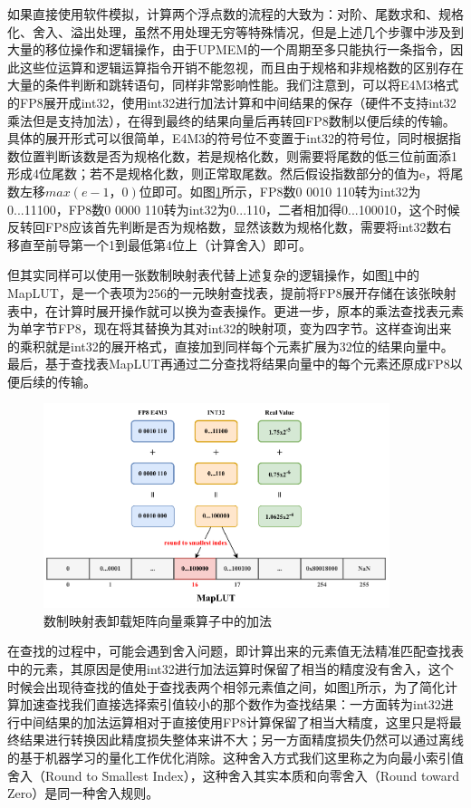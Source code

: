 如果直接使用软件模拟，计算两个浮点数的流程的大致为：对阶、尾数求和、规格化、舍入、溢出处理，虽然不用处理无穷等特殊情况，但是上述几个步骤中涉及到大量的移位操作和逻辑操作，由于UPMEM的一个周期至多只能执行一条指令\cite{UPMEMHotChips}，因此这些位运算和逻辑运算指令开销不能忽视，而且由于规格和非规格数的区别存在大量的条件判断和跳转语句，同样非常影响性能。我们注意到，可以将E4M3格式的FP8展开成int32，使用int32进行加法计算和中间结果的保存（硬件不支持int32乘法但是支持加法），在得到最终的结果向量后再转回FP8数制以便后续的传输。具体的展开形式可以很简单，E4M3的符号位不变置于int32的符号位，同时根据指数位置判断该数是否为规格化数，若是规格化数，则需要将尾数的低三位前面添1形成4位尾数；若不是规格化数，则正常取尾数。然后假设指数部分的值为e，将尾数左移$max(e-1，0)$位即可。如图\ref{LUTBS}所示，FP8数0 0010 110转为int32为0...11100，FP8数0 0000 110转为int32为0...110，二者相加得0...100010，这个时候反转回FP8应该首先判断是否为规格数，显然该数为规格化数，需要将int32数右移直至前导第一个1到最低第4位上（计算舍入）即可。

但其实同样可以使用一张数制映射表代替上述复杂的逻辑操作，如图\ref{LUTBS}中的MapLUT，是一个表项为256的一元映射查找表，提前将FP8展开存储在该张映射表中，在计算时展开操作就可以换为查表操作。更进一步，原本的乘法查找表元素为单字节FP8，现在将其替换为其对int32的映射项，变为四字节。这样查询出来的乘积就是int32的展开格式，直接加到同样每个元素扩展为32位的结果向量中。最后，基于查找表MapLUT再通过二分查找将结果向量中的每个元素还原成FP8以便后续的传输。

\begin{figure}[!htbp]
	\centering
    \includegraphics[width=0.9\textwidth]{figures/BinarySearch.pdf}
	\caption{数制映射表卸载矩阵向量乘算子中的加法}
    \label{LUTBS}
\end{figure}

在查找的过程中，可能会遇到舍入问题，即计算出来的元素值无法精准匹配查找表中的元素，其原因是使用int32进行加法运算时保留了相当的精度没有舍入，这个时候会出现待查找的值处于查找表两个相邻元素值之间，如图\ref{LUTBS}所示，为了简化计算加速查找我们直接选择索引值较小的那个数作为查找结果：一方面转为int32进行中间结果的加法运算相对于直接使用FP8计算保留了相当大精度，这里只是将最终结果进行转换因此精度损失整体来讲不大；另一方面精度损失仍然可以通过离线的基于机器学习的量化工作优化消除。这种舍入方式我们这里称之为向最小索引值舍入（Round to Smallest Index），这种舍入其实本质和向零舍入（Round toward Zero）是同一种舍入规则。

